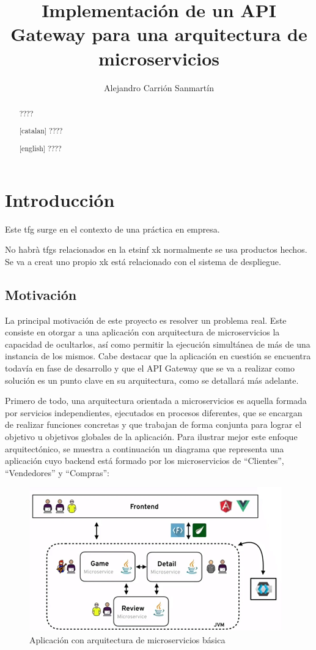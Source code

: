 \documentclass[11pt,spanish,listoffigures]{tfgetsinf}
\title{Implementación de un API Gateway para una arquitectura de microservicios}
\author{Alejandro Carrión Sanmartín}
\begin{document}

\begin{abstract}
????
\end{abstract}
\begin{abstract}[catalan]
????
\end{abstract}
\begin{abstract}[english]
????
\end{abstract}

\mainmatter


\chapter{Introducción}

Este tfg surge en el contexto de una práctica en empresa.

No habrà tfgs relacionados en la etsinf xk normalmente se usa productos hechos. Se va a creat uno propio xk está relacionado con el sistema de despliegue.

\section{Motivación}

La principal motivación de este proyecto es resolver un problema real. Este consiste en otorgar a una aplicación con arquitectura de microservicios la capacidad de ocultarlos, así como permitir la ejecución simultánea de más de una instancia de los mismos. Cabe destacar que la aplicación en cuestión se encuentra todavía en fase de desarrollo y que el API Gateway que se va a realizar como solución es un punto clave en su arquitectura, como se detallará más adelante.

Primero de todo, una arquitectura orientada a microservicios es aquella formada por servicios independientes, ejecutados en procesos diferentes, que se encargan de realizar funciones concretas y que trabajan de forma conjunta para lograr el objetivo u objetivos globales de la aplicación. Para ilustrar mejor este enfoque arquitectónico, se muestra a continuación un diagrama que representa una aplicación cuyo backend está formado por los microservicios de “Clientes”, “Vendedores” y “Compras”:

\begin{figure}
	\centering
	\includegraphics{images/arquitecturaMicroserviciosBasica}
	\caption{Aplicación con arquitectura de microservicios básica}
\end{figure}
\end{document}
